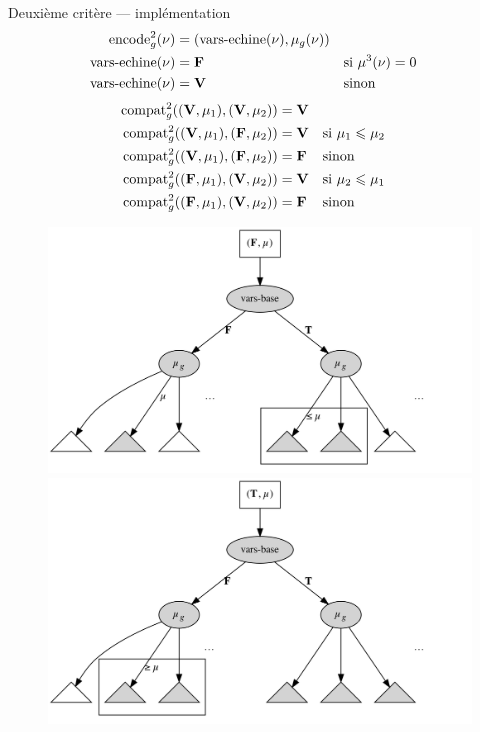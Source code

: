 \documentclass[serif]{beamer}
\newcommand{\mathhyphen}{{\hbox{-}}}
\begin{document}

\begin{frame}{Deuxième critère — implémentation}
\tiny
\begin{align*}
    \mathrm{encode}^2_g (\nu) &=
    (\mathrm{vars\mathhyphen echine} (\nu), \mu_g (\nu))
  \\
    \mathrm{vars\mathhyphen echine} (\nu) &=
    \bold{F} &&
    \text{si } \mu^3 (\nu) = 0
  \\
    \mathrm{vars\mathhyphen echine} (\nu) &=
    \bold{V} &&
    \text{sinon}
\end{align*}
\begin{align*}
    \mathrm{compat}^2_g ((\bold{V}, \mu_1), (\bold{V}, \mu_2)) &=
    \bold{V}
  \\
    \mathrm{compat}^2_g ((\bold{V}, \mu_1), (\bold{F}, \mu_2)) &=
    \bold{V} &&
    \text{si } \mu_1 \leqslant \mu_2
  \\
    \mathrm{compat}^2_g ((\bold{V}, \mu_1), (\bold{F}, \mu_2)) &=
    \bold{F} &&
    \text{sinon}
  \\
    \mathrm{compat}^2_g ((\bold{F}, \mu_1), (\bold{V}, \mu_2)) &=
    \bold{V} &&
    \text{si } \mu_2 \leqslant \mu_1
  \\
    \mathrm{compat}^2_g ((\bold{F}, \mu_1), (\bold{V}, \mu_2)) &=
    \bold{F} &&
    \text{sinon}
\end{align*}
\begin{figure}[h]
  \centering
  \includegraphics[scale=0.09]{graphs/crit2_1}
  \includegraphics[scale=0.09]{graphs/crit2_2}
\end{figure}
\end{frame}
\end{document}
